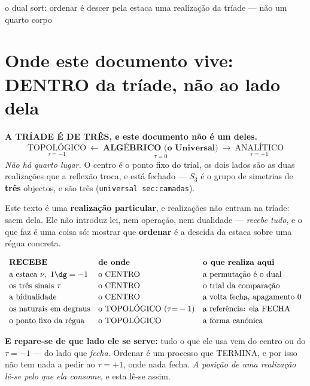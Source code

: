 \documentclass[11pt,a4paper]{article}
\newcommand{\code}[1]{\texttt{\small #1}}
\begin{document}
       {o dual sort: ordenar é descer pela estaca}
       {uma realização da tríade --- não um quarto corpo}
\maketitle

\section*{Onde este documento vive: DENTRO da tríade, não ao lado dela}

\noindent\textbf{A TRÍADE É DE TRÊS, e este documento não é um deles.}
\[
\boxed{\;\underset{\tau=-1}{\text{TOPOLÓGICO}}\ \longleftarrow\
\underset{\tau=0}{\textbf{ALGÉBRICO (o Universal)}}\ \longrightarrow\
\underset{\tau=+1}{\text{ANALÍTICO}}\;}
\]
\emph{Não há quarto lugar.} O centro é o ponto fixo do trial, os dois lados são as duas
realizações que a reflexão troca, e está fechado --- $S_3$ é o grupo de simetrias de
\textbf{três} objectos, e são três (\code{universal sec:camadas}).

Este texto é uma \textbf{realização particular}, e realizações não entram na tríade: saem
dela. Ele não introduz lei, nem operação, nem dualidade --- \emph{recebe tudo}, e o que
faz é uma coisa só: mostrar que \textbf{ordenar} é a descida da estaca sobre uma régua
concreta.

\[
\begin{array}{lll}
\textbf{RECEBE} & \textbf{de onde} & \textbf{o que realiza aqui}\\[3pt]
\text{a estaca }\nu,\ 1\dg=-1 & \text{o CENTRO} & \text{a permutação é o dual}\\[2pt]
\text{os três sinais }\tau & \text{o CENTRO} & \text{o trial da comparação}\\[2pt]
\text{a bidualidade} & \text{o CENTRO} & \text{a volta fecha, apagamento }0\\[2pt]
\text{os naturais em degraus} & \text{o TOPOLÓGICO }(\tau{=}-1) & \text{a referência: ela FECHA}\\[2pt]
\text{o ponto fixo da régua} & \text{o TOPOLÓGICO} & \text{a forma canónica}
\end{array}
\]

\noindent\textbf{E repare-se de que lado ele se serve:} tudo o que ele usa vem do centro ou
do $\tau=-1$ --- do lado que \emph{fecha}. Ordenar é um processo que TERMINA, e por isso
não tem nada a pedir ao $\tau=+1$, onde nada fecha. \emph{A posição de uma realização
lê-se pelo que ela consome}, e esta lê-se assim.
\end{document}
